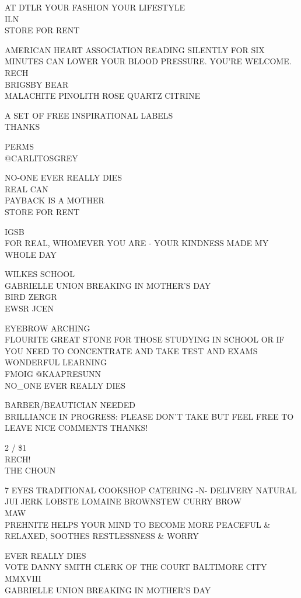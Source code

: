 \documentclass[10pt,letterpaper]{article}
\begin{document}
AT DTLR YOUR FASHION YOUR LIFESTYLE\\
ILN\\
STORE FOR RENT

AMERICAN HEART ASSOCIATION READING SILENTLY FOR SIX MINUTES CAN LOWER YOUR BLOOD PRESSURE.  YOU'RE WELCOME.\\
RECH\\
BRIGSBY BEAR\\
MALACHITE PINOLITH ROSE QUARTZ CITRINE

A SET OF FREE INSPIRATIONAL LABELS\\
THANKS

PERMS\\
@CARLITOSGREY

NO{-}ONE EVER REALLY DIES\\
REAL CAN\\
PAYBACK IS A MOTHER\\
STORE FOR RENT

IGSB\\
FOR REAL, WHOMEVER YOU ARE {-} YOUR KINDNESS MADE MY WHOLE DAY

WILKES SCHOOL\\
GABRIELLE UNION BREAKING IN MOTHER'S DAY\\
BIRD ZERGR\\
EWSR JCEN

EYEBROW ARCHING\\
FLOURITE GREAT STONE FOR THOSE STUDYING IN SCHOOL OR IF YOU NEED TO CONCENTRATE AND TAKE TEST AND EXAMS WONDERFUL LEARNING\\
FMOIG @KAAPRESUNN\\
NO\_ONE EVER  REALLY DIES

BARBER/BEAUTICIAN NEEDED\\
BRILLIANCE IN PROGRESS: PLEASE DON'T TAKE BUT FEEL FREE TO LEAVE NICE COMMENTS THANKS!

2 / \$1\\
RECH!\\
THE CHOUN

7 EYES TRADITIONAL COOKSHOP CATERING {-}N{-} DELIVERY NATURAL JUI JERK LOBSTE LOMAINE BROWNSTEW CURRY BROW\\
MAW\\
PREHNITE HELPS YOUR MIND TO BECOME MORE PEACEFUL \& RELAXED, SOOTHES RESTLESSNESS \& WORRY

EVER REALLY DIES\\
VOTE DANNY SMITH CLERK OF THE COURT BALTIMORE CITY\\
MMXVIII\\
GABRIELLE UNION BREAKING IN MOTHER'S DAY
\end{document}
